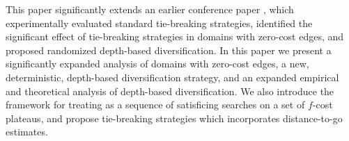 % 

This paper significantly extends an earlier conference paper \cite{Asai2016}, which experimentally evaluated standard tie-breaking strategies, identified the significant effect of tie-breaking strategies in domains with zero-cost edges, and proposed randomized depth-based diversification.
In this paper we present a significantly expanded analysis of domains with zero-cost edges, a new, deterministic, depth-based diversification strategy, and an expanded empirical and theoretical analysis of depth-based diversification.  We also introduce the 
framework for treating \astar as a sequence of satisficing searches on 
a set of $f$-cost plateaus, and propose tie-breaking strategies which incorporates distance-to-go estimates.
